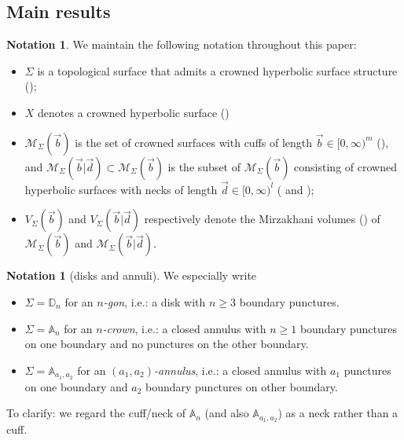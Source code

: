 \documentclass{amsart}
\theoremstyle{definition}
\newtheorem{notation}[proposition]{Notation}
\begin{document}
\subsection{Main results}

\begin{notation}
    We maintain the following notation throughout this paper:
    \begin{itemize}
        \item $\Sigma$ is a topological surface that admits a crowned hyperbolic surface structure ();
        \item $X$ denotes a crowned hyperbolic surface ()
        \item $\mathcal{M}_\Sigma(\vec{b})$ is the set of crowned surfaces with cuffs of length $\vec{b}\in[0,\infty)^m$ (), and $\mathcal{M}_\Sigma(\vec{b}|\vec{d})\subset \mathcal{M}_\Sigma(\vec{b})$ is the subset of $\mathcal{M}_\Sigma(\vec{b})$ consisting of crowned hyperbolic surfaces with necks of length $\vec{d}\in[0,\infty)^l$ ( and );
        \item $V_\Sigma(\vec{b})$ and $V_\Sigma(\vec{b}|\vec{d})$ respectively denote the Mirzakhani volumes () of $\mathcal{M}_\Sigma(\vec{b})$ and $\mathcal{M}_\Sigma(\vec{b}|\vec{d})$.
    \end{itemize}
\end{notation}


\begin{notation}[disks and annuli]\label{notn:specialsurfaces}
    We especially write
    \begin{itemize}
    \item $\Sigma=\mathbb{D}_n$ for an \emph{$n$-gon}, i.e.: a disk with $n\geqslant 3$ boundary punctures.  
    \item $\Sigma=\mathbb{A}_{n}$ for an \emph{$n$-crown}, i.e.: a closed annulus with $n\geqslant 1$ boundary punctures on one boundary and no punctures on the other boundary.
    \item $\Sigma=\mathbb{A}_{a_1,a_2}$ for an \emph{$(a_1,a_2)$-annulus}, i.e.: a closed annulus with $a_1$ punctures on one boundary and $a_2$ boundary punctures on other boundary.    
    \end{itemize}
    To clarify: we regard the cuff/neck of $\mathbb{A}_n$ (and also $\mathbb{A}_{a_1,a_2}$) as a neck rather than a cuff.
\end{notation}
\end{document}
